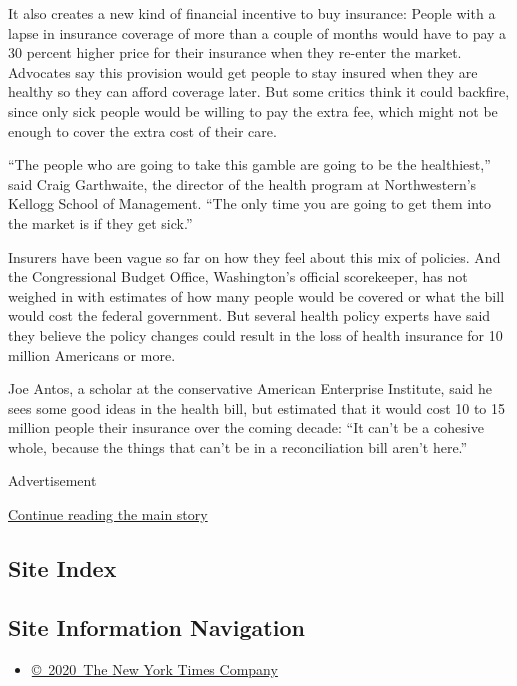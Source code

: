 It also creates a new kind of financial incentive to buy insurance:
People with a lapse in insurance coverage of more than a couple of
months would have to pay a 30 percent higher price for their insurance
when they re-enter the market. Advocates say this provision would get
people to stay insured when they are healthy so they can afford coverage
later. But some critics think it could backfire, since only sick people
would be willing to pay the extra fee, which might not be enough to
cover the extra cost of their care.

``The people who are going to take this gamble are going to be the
healthiest,'' said Craig Garthwaite, the director of the health program
at Northwestern's Kellogg School of Management. ``The only time you are
going to get them into the market is if they get sick.''

Insurers have been vague so far on how they feel about this mix of
policies. And the Congressional Budget Office, Washington's official
scorekeeper, has not weighed in with estimates of how many people would
be covered or what the bill would cost the federal government. But
several health policy experts have said they believe the policy changes
could result in the loss of health insurance for 10 million Americans or
more.

Joe Antos, a scholar at the conservative American Enterprise Institute,
said he sees some good ideas in the health bill, but estimated that it
would cost 10 to 15 million people their insurance over the coming
decade: ``It can't be a cohesive whole, because the things that can't be
in a reconciliation bill aren't here.''

Advertisement

\protect\hyperlink{after-bottom}{Continue reading the main story}

\hypertarget{site-index}{%
\subsection{Site Index}\label{site-index}}

\hypertarget{site-information-navigation}{%
\subsection{Site Information
Navigation}\label{site-information-navigation}}

\begin{itemize}
\tightlist
\item
  \href{https://help.nytimes.com/hc/en-us/articles/115014792127-Copyright-notice}{©~2020~The
  New York Times Company}
\end{itemize}

